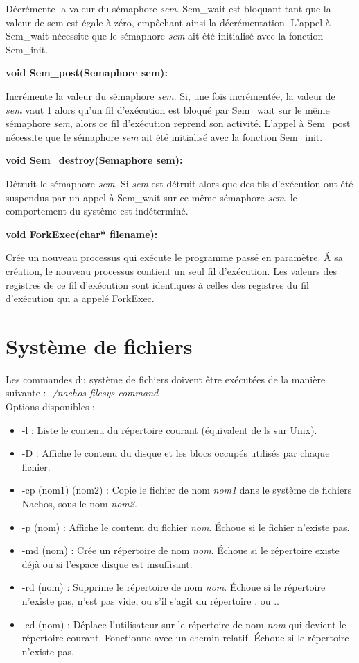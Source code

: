\documentclass[12pt]{report}
\begin{document}
Décrémente la valeur du sémaphore \textit{sem}. Sem\_wait est bloquant tant que la valeur de sem est égale à zéro, empêchant ainsi la décrémentation.
L'appel à Sem\_wait nécessite que le sémaphore \textit{sem} ait été initialisé avec la fonction Sem\_init.
\bigskip


\textbf{void Sem\_post(Semaphore sem):}

Incrémente la valeur du sémaphore \textit{sem}. Si, une fois incrémentée, la valeur de \textit{sem} vaut 1 alors qu'un fil d'exécution est bloqué par Sem\_wait sur le même sémaphore \textit{sem}, alors ce fil d'exécution reprend son activité.
L'appel à Sem\_post nécessite que le sémaphore \textit{sem} ait été initialisé avec la fonction Sem\_init.
\bigskip


\textbf{void Sem\_destroy(Semaphore sem):}

Détruit le sémaphore \textit{sem}. Si \textit{sem} est détruit alors que des fils d'exécution ont été suspendus par un appel à Sem\_wait sur ce même sémaphore \textit{sem}, le comportement du système est indéterminé.
\bigskip


\textbf{void ForkExec(char* filename):}

Crée un nouveau processus qui exécute le programme passé en paramètre. \'A sa création, le nouveau processus contient un seul fil d'exécution. Les valeurs des registres de ce fil d'exécution sont identiques à celles des registres du fil d'exécution qui a appelé ForkExec.
\bigskip


\section{Système de fichiers}

Les commandes du système de fichiers doivent être exécutées de la manière suivante :
\textit{./nachos-filesys command}\\

Options disponibles :\\
\begin{itemize}\renewcommand{\labelitemi}{$\bullet$}
\item -l  : Liste le contenu du répertoire courant (équivalent de ls sur Unix).
\item  -D  : Affiche le contenu du disque et les blocs occupés utilisés par chaque fichier.
\item  -cp (nom1) (nom2) : Copie le fichier de nom \textit{nom1} dans le système de fichiers Nachos, sous le nom \textit{nom2}.
\item  -p (nom) : Affiche le contenu du fichier \textit{nom}. Échoue si le fichier n'existe pas.
\item  -md (nom) : Crée un répertoire de nom \textit{nom}. Échoue si le répertoire existe déjà ou si l'espace disque est insuffisant.
\item  -rd (nom) : Supprime le répertoire de nom \textit{nom}. Échoue si le répertoire n'existe pas, n'est pas vide, ou s'il s'agit du répertoire . ou ..
\item -cd (nom) : Déplace l'utilisateur sur le répertoire de nom \textit{nom} qui devient le répertoire courant. Fonctionne avec un chemin relatif. Échoue si le répertoire n'existe pas.
\end{itemize}
\end{document}

